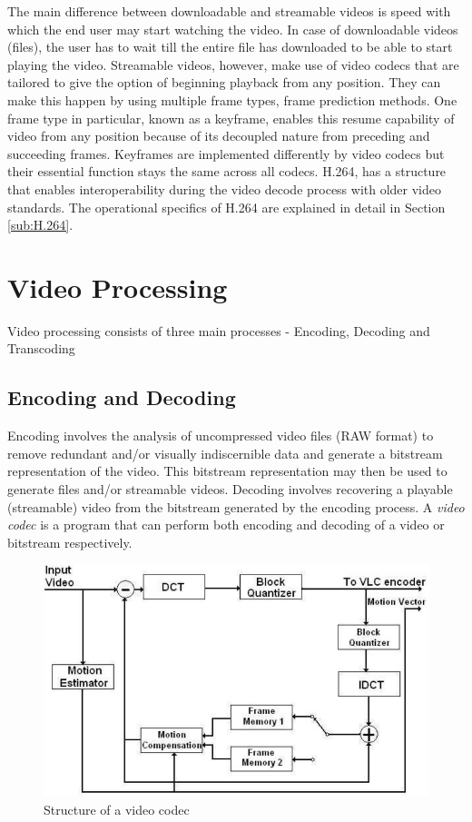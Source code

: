 \documentclass[letterpaper,12pt,titlepage,oneside,final]{report}
\begin{document}
            The main difference between downloadable and streamable videos is speed with which the end user may start watching the video. In case of downloadable videos (files), the user has to wait till the entire file has downloaded to be able to start playing the video. Streamable videos, however, make use of video codecs that are tailored to give the option of beginning playback from any position. They can make this happen by using multiple frame types, frame prediction methods. One frame type in particular, known as a keyframe, enables this resume capability of video from any position because of its decoupled nature from preceding and succeeding frames. Keyframes are implemented differently by video codecs but their essential function stays the same across all codecs. H.264, has a structure that enables interoperability during the video decode process with older video standards. The operational specifics of H.264 are explained in detail in Section \ref{sub:H.264}.

    \section{Video Processing}
        Video processing consists of three main processes - Encoding, Decoding and Transcoding
        \subsection{Encoding and Decoding}
            Encoding involves the analysis of uncompressed video files (RAW format) to remove redundant and/or visually indiscernible data and generate a bitstream representation of the video. This bitstream representation may then be used to generate files and/or streamable videos. Decoding involves recovering a playable (streamable) video from the bitstream generated by the encoding process. A \textit{video codec} is a program that can perform both encoding and decoding of a video or bitstream respectively. 
            \begin{figure}[!h]
                \centering
                \includegraphics[width=\textwidth]{codec}
                \caption{Structure of a video codec}
                \label{codec}
            \end{figure}
\end{document}
